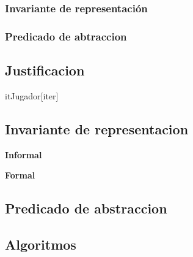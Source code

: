 \begin{Representacion}
\subsubsection{Invariante de representación}

\subsubsection{Predicado de abtraccion}

\subsection{Justificacion}

	\begin{Estructura}{itJugador}[iter]
		\begin{Tupla}[iter]
		\end{Tupla}
	\end{Estructura}
\subsection{Invariante de representacion}

\textbf{Informal}

\textbf{Formal}

\subsection{Predicado de abstraccion}

\end{Representacion}
\subsection{Algoritmos}

